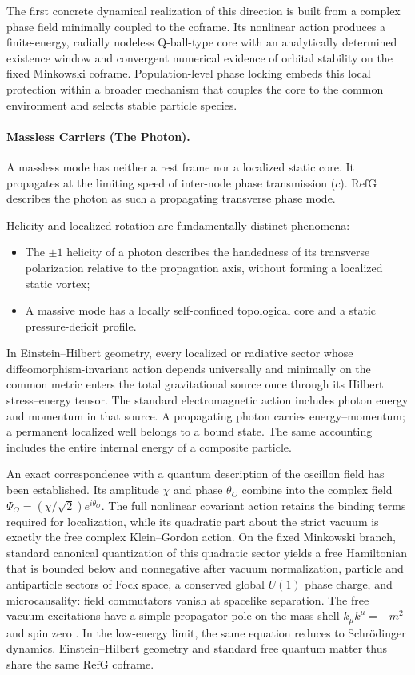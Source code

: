 \documentclass[11pt,a4paper]{article}
\newcommand{\RefG}{\mathrm{RefG}}
\begin{document}
The first concrete dynamical realization of this direction is built from a complex phase field minimally coupled to the coframe. Its nonlinear action produces a finite-energy, radially nodeless Q-ball-type core with an analytically determined existence window and convergent numerical evidence of orbital stability on the fixed Minkowski coframe. Population-level phase locking embeds this local protection within a broader mechanism that couples the core to the common environment and selects stable particle species.

\paragraph{Massless Carriers (The Photon).} A massless mode has neither a rest frame nor a localized static core. It propagates at the limiting speed of inter-node phase transmission ($c$). $\RefG$ describes the photon as such a propagating transverse phase mode.

Helicity and localized rotation are fundamentally distinct phenomena:
\begin{itemize}
\item The $\pm 1$ helicity of a photon describes the handedness of its transverse polarization relative to the propagation axis, without forming a localized static vortex;
\item A massive mode has a locally self-confined topological core and a static pressure-deficit profile.
\end{itemize}

In Einstein--Hilbert geometry, every localized or radiative sector whose diffeomorphism-invariant action depends universally and minimally on the common metric enters the total gravitational source once through its Hilbert stress--energy tensor. The standard electromagnetic action includes photon energy and momentum in that source. A propagating photon carries energy--momentum; a permanent localized well belongs to a bound state. The same accounting includes the entire internal energy of a composite particle.

An exact correspondence with a quantum description of the oscillon field has been established. Its amplitude $\chi$ and phase $\theta_O$ combine into the complex field $\Psi_O=(\chi/\sqrt2)e^{i\theta_O}$. The full nonlinear covariant action retains the binding terms required for localization, while its quadratic part about the strict vacuum is exactly the free complex Klein--Gordon action. On the fixed Minkowski branch, standard canonical quantization of this quadratic sector yields a free Hamiltonian that is bounded below and nonnegative after vacuum normalization, particle and antiparticle sectors of Fock space, a conserved global $U(1)$ phase charge, and microcausality: field commutators vanish at spacelike separation. The free vacuum excitations have a simple propagator pole on the mass shell $k_\mu k^\mu=-m^2$ and spin zero \citep{tongqft,wigner1939}. In the low-energy limit, the same equation reduces to Schrödinger dynamics. Einstein--Hilbert geometry and standard free quantum matter thus share the same $\RefG$ coframe.
\end{document}
